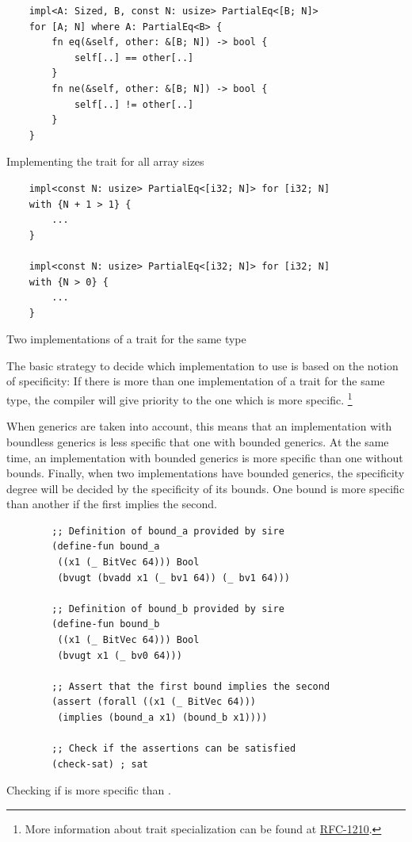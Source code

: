 \begin{listing}[h]
	\begin{verbatim}
    impl<A: Sized, B, const N: usize> PartialEq<[B; N]> 
    for [A; N] where A: PartialEq<B> {
        fn eq(&self, other: &[B; N]) -> bool {
            self[..] == other[..]
        }
        fn ne(&self, other: &[B; N]) -> bool {
            self[..] != other[..]
        }
    }
	\end{verbatim}
    \caption{Implementing the  trait for all array sizes}
  \label{lst:trait_const_generics}
\end{listing}

\begin{listing}[h]
	\begin{verbatim}
    impl<const N: usize> PartialEq<[i32; N]> for [i32; N]
    with {N + 1 > 1} {
        ...
    }
   
    impl<const N: usize> PartialEq<[i32; N]> for [i32; N]
    with {N > 0} {
        ...
    }
	\end{verbatim}
    \caption{Two implementations of a trait for the same type}
  \label{lst:trait_const_generics_spec}
\end{listing}

The basic strategy to decide which implementation to use is based on the notion
of specificity: If there is more than one implementation of a trait for the
same type, the compiler will give priority to the one which is more specific.
\footnote{More information about trait specialization can be found at
\href{https://github.com/rust-lang/rfcs/blob/master/text/1210-impl-specialization.md}{RFC-1210}.}

When generics are taken into account, this means that an implementation with
boundless generics is less specific that one with bounded generics. At the same
time, an implementation with bounded generics is more specific than one without
bounds. Finally, when two implementations have bounded generics, the
specificity degree will be decided by the specificity of its bounds. One bound
is more specific than another if the first implies the second.

\begin{listing}[h]
	\begin{verbatim}
        ;; Definition of bound_a provided by sire
        (define-fun bound_a
         ((x1 (_ BitVec 64))) Bool 
         (bvugt (bvadd x1 (_ bv1 64)) (_ bv1 64)))

        ;; Definition of bound_b provided by sire
        (define-fun bound_b 
         ((x1 (_ BitVec 64))) Bool 
         (bvugt x1 (_ bv0 64)))

        ;; Assert that the first bound implies the second
        (assert (forall ((x1 (_ BitVec 64))) 
         (implies (bound_a x1) (bound_b x1))))

        ;; Check if the assertions can be satisfied
        (check-sat) ; sat
	\end{verbatim}
    \caption{Checking if  is more specific than .}
  \label{lst:trait_spec_smt}
\end{listing}

